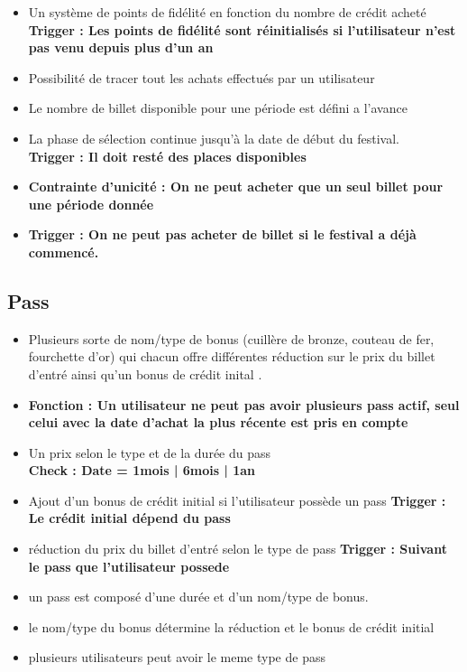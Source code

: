\documentclass{article}
\begin{document}
\begin{itemize}
    \item Un système de points de fidélité en fonction du nombre de crédit acheté
    \textbf{Trigger : Les points de fidélité sont réinitialisés si l'utilisateur n'est pas venu depuis plus d'un an}
    \item Possibilité de tracer tout les achats effectués par un utilisateur 
   
    \item Le nombre de billet disponible pour une période est défini a l'avance 
    
    \item La phase de sélection continue jusqu'à la date de début du festival.\\
    \textbf{Trigger : Il doit resté des places disponibles }
    \item  \textbf{Contrainte d'unicité : On ne peut acheter que un seul billet pour une période donnée }
    \item \textbf{Trigger : On ne peut pas acheter de billet si le festival a déjà commencé.}
\end{itemize}
\subsection{Pass}
\begin{itemize}
    \item Plusieurs sorte de nom/type de bonus (cuillère de bronze, couteau de fer, fourchette d'or) qui chacun offre différentes réduction sur le prix du billet d'entré ainsi qu'un bonus de crédit inital .
    \item \textbf{Fonction : Un utilisateur ne peut pas avoir plusieurs pass actif, seul celui avec la date d'achat la plus récente est pris en compte} 
    \item Un prix selon le type et de la durée du pass \\
    \textbf{Check : Date = 1mois | 6mois | 1an}
    \item Ajout d'un bonus de crédit initial si l'utilisateur possède un pass 
    \textbf{Trigger : Le crédit initial dépend du pass }
    \item réduction du prix du billet d'entré selon le type de pass
    \textbf{Trigger : Suivant le pass que l'utilisateur possede}
    \item un pass est composé d'une durée et d'un nom/type de bonus. 
    \item le nom/type du bonus détermine la réduction et le bonus de crédit initial
    \item plusieurs utilisateurs peut avoir le meme type de pass 
\end{itemize}
\end{document}

